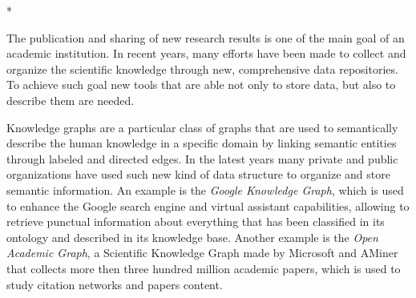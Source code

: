 \documentclass[%
    corpo=13.5pt,
    twoside,
    oldstyle,
    tipotesi=magistrale,
    greek,
    evenboxes
]{toptesi}
\begin{document}

\english

\begin{ThesisTitlePage}*




%

\end{ThesisTitlePage}



\makeatletter
\newenvironment{miadedica}{
    \clearpage
    \if@twoside
        \ifodd\c@page\else\thispagestyle{empty}\null\clearpage\fi
    \fi
    \thispagestyle{empty}%
    \list{}{\labelwidth\z@
    \leftmargin.73\textwidth
    \parindent\z@
    \raggedright\LARGE\itshape}\item[]
    \normalsize
}

\sommario


The publication and sharing of new research results is one of the
main goal of an academic institution. In recent years, many efforts have been
made to collect and organize the scientific knowledge through new,
comprehensive data repositories.
To achieve such goal new tools that are able not only to store data, but also to 
describe them are needed.

Knowledge graphs are a particular class of graphs that are used to
semantically describe the human knowledge in a specific domain by linking
semantic entities through labeled and directed edges.
In the latest years many private and public organizations have used such 
new kind of data structure to organize and store semantic information.
An example is the \emph{Google Knowledge Graph}, which is used to enhance the 
Google search engine and virtual assistant capabilities, allowing to 
retrieve punctual information about everything that has been classified 
in its ontology and described in its knowledge base.
Another example is the \emph{Open Academic Graph}, a Scientific Knowledge Graph 
made by Microsoft and AMiner that collects more then three hundred 
million academic papers, which is used to study citation networks and 
papers content.
\end{document}

